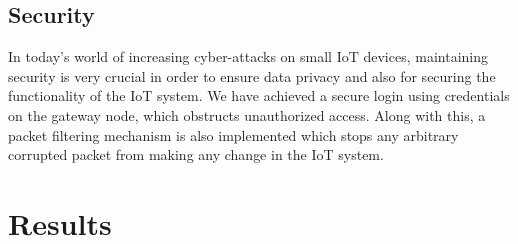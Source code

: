 \documentclass[11pt, oneside]{article}   	%
\begin{document}
\subsection{Security}

In today’s world of increasing cyber-attacks on small IoT devices, maintaining security is very crucial in order to ensure data privacy and also for securing the functionality of the IoT system. We have achieved a secure login using credentials on the gateway node, which obstructs unauthorized access. Along with this, a packet filtering mechanism is also implemented which stops any arbitrary corrupted packet from making any change in the IoT system.\\

\section{Results}
\end{document}

